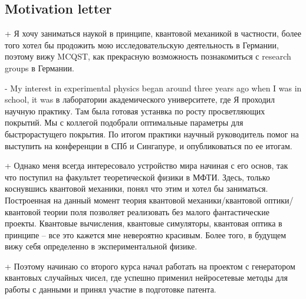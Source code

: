 





\subsection*{Motivation letter}

+
Я хочу заниматься наукой в принципе, квантовой механикой в частности, более того хотел бы продожить мою исследовательскую деятельность в Германии, поэтому вижу MCQST, как прекрасную возможность познакомиться с research groups в Германии.

-
My interest in experimental physics began around three years ago when I 
was in school, it was в лаборатории академического университете, где Я проходил научную практику. Там была готовая устанвка по росту просветляющих покрытий. Мы с коллегой подобрали оптимальные параметры для быстрорастущего покрытия. По итогом практики научный руководитель помог на выступить на конференции в СПб и Сингапуре, и опубликоваться по ее итогам.

+
Однако меня всегда интересовало устройство мира начиная с его основ, так что поступил на факультет теоретической физики в МФТИ. Здесь, только коснувшись квантовой механики, понял что этим и хотел бы заниматься. Построенная на данный момент теория квантовой механики/квантовой оптики/квантовой теории поля позволяет реализовать без малого фантастические проекты. 
Квантовые вычисления, квантовые симуляторы, квантовая оптика в принципе -- все это кажется мне невероятно красивым. Более того, в будущем вижу себя определенно в экспериментальной физике. 

+
Поэтому начинаю со второго курса начал работать на проектом с генератором квантовых случайных чисел, где успешно применил нейросетевые методы для работы с данными и принял участие в подготовке патента. 

